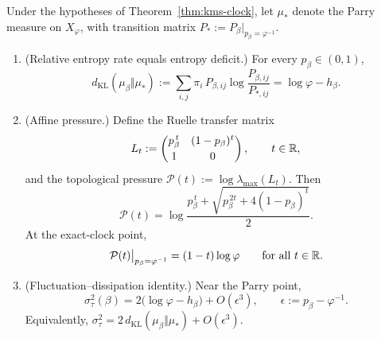 \begin{theorem}\label{thm:variational}
Under the hypotheses of Theorem~\ref{thm:kms-clock}, let $\mu_*$ denote the Parry measure on $X_\varphi$, with transition matrix $P_*:=P_\beta\big|_{p_\beta=\varphi^{-1}}$.
\begin{enumerate}[label=\textup{(\roman*)},leftmargin=*,itemsep=4pt]
\item \textup{(Relative entropy rate equals entropy deficit.)} For every $p_\beta\in(0,1)$,
\begin{equation}\label{eq:kl-parry}
d_{\mathrm{KL}}(\mu_\beta\Vert\mu_*)
:=
\sum_{i,j}\pi_i\,P_{\beta,ij}\log\frac{P_{\beta,ij}}{P_{*,ij}}
=
\log\varphi-h_\beta.
\end{equation}
\item \textup{(Affine pressure.)} Define the Ruelle transfer matrix
\[
L_t
:=
\begin{pmatrix}
p_\beta^{\,t}&(1-p_\beta)^t\\[2pt]
1&0
\end{pmatrix},
\qquad t\in\mathbb{R},
\]
and the topological pressure $\mathcal P(t):=\log\lambda_{\max}(L_t)$. Then
\begin{equation}\label{eq:pressure-general}
\mathcal P(t)
=
\log\frac{p_\beta^{\,t}+\sqrt{p_\beta^{\,2t}+4(1-p_\beta)^t}}{2}.
\end{equation}
At the exact-clock point,
\begin{equation}\label{eq:pressure-affine}
\mathcal P(t)\big|_{p_\beta=\varphi^{-1}}
=
(1-t)\log\varphi
\qquad\text{for all }t\in\mathbb{R}.
\end{equation}
\item \textup{(Fluctuation--dissipation identity.)} Near the Parry point,
\begin{equation}\label{eq:fdt}
\sigma_\tau^2(\beta)
=
2\bigl(\log\varphi-h_\beta\bigr)+O(\epsilon^3),
\qquad
\epsilon:=p_\beta-\varphi^{-1}.
\end{equation}
Equivalently, $\sigma_\tau^2=2\,d_{\mathrm{KL}}(\mu_\beta\Vert\mu_*)+O(\epsilon^3)$.
\end{enumerate}
\end{theorem}

